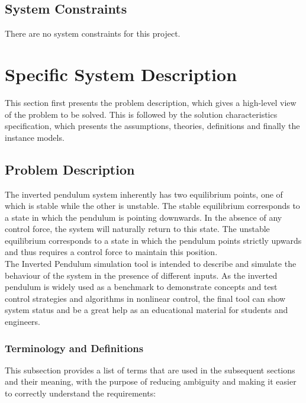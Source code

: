 \documentclass[12pt]{article}
\begin{document}
\subsection{System Constraints}

There are no system constraints for this project.

\section{Specific System Description}

This section first presents the problem description, which gives a high-level view of the problem to be solved.  This is followed by the solution characteristics
specification, which presents the assumptions, theories, definitions and finally the instance models.

\subsection{Problem Description} \label{Sec_pd}
The inverted pendulum system inherently has two equilibrium points, one of which is stable while the other is unstable. The stable equilibrium corresponds to a state in which the pendulum is pointing downwards. In the absence of any
control force, the system will naturally return to this state. The unstable equilibrium corresponds to a state in which the pendulum points strictly upwards and thus requires a control force to maintain this position.\\

The Inverted Pendulum simulation tool is intended to describe and simulate the behaviour of the system in the presence of different inputs. As the inverted pendulum is widely used as a benchmark to demonstrate concepts and test control strategies and algorithms in nonlinear control, the final tool can show system status and be a great help as an educational material for students and engineers.


\subsubsection{Terminology and  Definitions}

This subsection provides a list of terms that are used in the subsequent
sections and their meaning, with the purpose of reducing ambiguity and making it easier to correctly understand the requirements:
\end{document}
